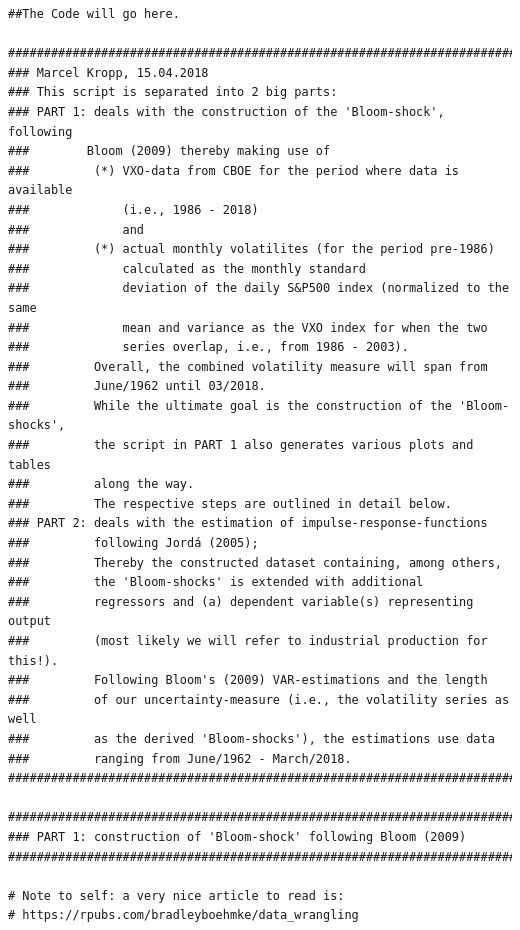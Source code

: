 \documentclass[a4paper,12pt,oneside,pointednumbers,bibtotoc,bigheadings,liststotoc]{scrbook}
\begin{document}

\begingroup
\fontsize{10pt}{12pt}\selectfont
\begin{verbatim}  
##The Code will go here.

########################################################################
### Marcel Kropp, 15.04.2018
### This script is separated into 2 big parts:
### PART 1: deals with the construction of the 'Bloom-shock', following 
###        Bloom (2009) thereby making use of 
###         (*) VXO-data from CBOE for the period where data is available 
###             (i.e., 1986 - 2018)
###             and 
###         (*) actual monthly volatilites (for the period pre-1986) 
###             calculated as the monthly standard 
###             deviation of the daily S&P500 index (normalized to the same 
###             mean and variance as the VXO index for when the two
###             series overlap, i.e., from 1986 - 2003).
###         Overall, the combined volatility measure will span from
###         June/1962 until 03/2018.
###         While the ultimate goal is the construction of the 'Bloom-shocks',
###         the script in PART 1 also generates various plots and tables
###         along the way.
###         The respective steps are outlined in detail below.
### PART 2: deals with the estimation of impulse-response-functions
###         following Jordá (2005);
###         Thereby the constructed dataset containing, among others,
###         the 'Bloom-shocks' is extended with additional 
###         regressors and (a) dependent variable(s) representing output
###         (most likely we will refer to industrial production for this!).
###         Following Bloom's (2009) VAR-estimations and the length
###         of our uncertainty-measure (i.e., the volatility series as well
###         as the derived 'Bloom-shocks'), the estimations use data
###         ranging from June/1962 - March/2018.
########################################################################

########################################################################
### PART 1: construction of 'Bloom-shock' following Bloom (2009)
########################################################################

# Note to self: a very nice article to read is:
# https://rpubs.com/bradleyboehmke/data_wrangling


\end{verbatim}
\end{document}
